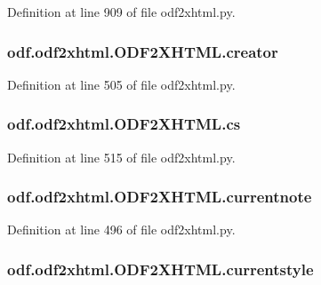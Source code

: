 Definition at line 909 of file odf2xhtml.\+py.

\hypertarget{classodf_1_1odf2xhtml_1_1ODF2XHTML_a6956690a2be9d98b0b46e7300a41a001}{
\subsubsection[{creator}]{\setlength{\rightskip}{0pt plus 5cm}odf.\+odf2xhtml.\+O\+D\+F2\+X\+H\+T\+M\+L.\+creator}}\label{classodf_1_1odf2xhtml_1_1ODF2XHTML_a6956690a2be9d98b0b46e7300a41a001}


Definition at line 505 of file odf2xhtml.\+py.

\hypertarget{classodf_1_1odf2xhtml_1_1ODF2XHTML_ac0b77e6c1bab706b2ec96c5b27597ca5}{
\subsubsection[{cs}]{\setlength{\rightskip}{0pt plus 5cm}odf.\+odf2xhtml.\+O\+D\+F2\+X\+H\+T\+M\+L.\+cs}}\label{classodf_1_1odf2xhtml_1_1ODF2XHTML_ac0b77e6c1bab706b2ec96c5b27597ca5}


Definition at line 515 of file odf2xhtml.\+py.

\hypertarget{classodf_1_1odf2xhtml_1_1ODF2XHTML_ab4e4c31b772b8e9d99e1a3119aaa3156}{
\subsubsection[{currentnote}]{\setlength{\rightskip}{0pt plus 5cm}odf.\+odf2xhtml.\+O\+D\+F2\+X\+H\+T\+M\+L.\+currentnote}}\label{classodf_1_1odf2xhtml_1_1ODF2XHTML_ab4e4c31b772b8e9d99e1a3119aaa3156}


Definition at line 496 of file odf2xhtml.\+py.

\hypertarget{classodf_1_1odf2xhtml_1_1ODF2XHTML_a0c95380c2d3df7c17d1388280c3043ff}{
\subsubsection[{currentstyle}]{\setlength{\rightskip}{0pt plus 5cm}odf.\+odf2xhtml.\+O\+D\+F2\+X\+H\+T\+M\+L.\+currentstyle}}\label{classodf_1_1odf2xhtml_1_1ODF2XHTML_a0c95380c2d3df7c17d1388280c3043ff}


